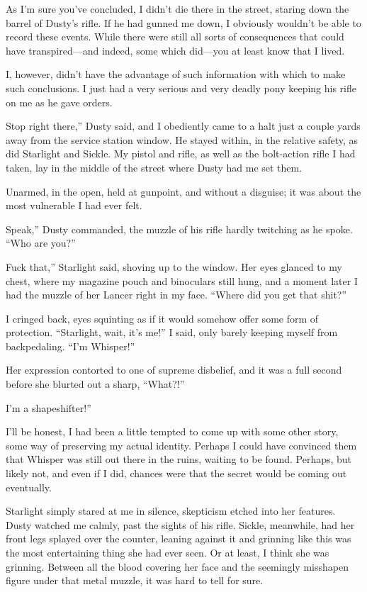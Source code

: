 As I’m sure you’ve concluded, I didn’t die there in the street, staring down the barrel of Dusty’s rifle. If he had gunned me down, I obviously wouldn’t be able to record these events. While there were still all sorts of consequences that could have transpired—and indeed, some which did—you at least know that I lived.

I, however, didn’t have the advantage of such information with which to make such conclusions. I just had a very serious and very deadly pony keeping his rifle on me as he gave orders.

\leavevmode{}Stop right there,” Dusty said, and I obediently came to a halt just a couple yards away from the service station window. He stayed within, in the relative safety, as did Starlight and Sickle. My pistol and rifle, as well as the bolt-action rifle I had taken, lay in the middle of the street where Dusty had me set them.

Unarmed, in the open, held at gunpoint, and without a disguise; it was about the most vulnerable I had ever felt.

\leavevmode{}Speak,” Dusty commanded, the muzzle of his rifle hardly twitching as he spoke. “Who are you?”

\leavevmode{}Fuck that,” Starlight said, shoving up to the window. Her eyes glanced to my chest, where my magazine pouch and binoculars still hung, and a moment later I had the muzzle of her Lancer right in my face. “Where did you get that shit?”

I cringed back, eyes squinting as if it would somehow offer some form of protection. “Starlight, wait, it’s me!” I said, only barely keeping myself from backpedaling. “I’m Whisper!”

Her expression contorted to one of supreme disbelief, and it was a full second before she blurted out a sharp, “What?!”

\leavevmode{}I’m a shapeshifter!”

I’ll be honest, I had been a little tempted to come up with some other story, some way of preserving my actual identity. Perhaps I could have convinced them that Whisper was still out there in the ruins, waiting to be found. Perhaps, but likely not, and even if I did, chances were that the secret would be coming out eventually.

Starlight simply stared at me in silence, skepticism etched into her features. Dusty watched me calmly, past the sights of his rifle. Sickle, meanwhile, had her front legs splayed over the counter, leaning against it and grinning like this was the most entertaining thing she had ever seen. Or at least, I think she was grinning. Between all the blood covering her face and the seemingly misshapen figure under that metal muzzle, it was hard to tell for sure.

